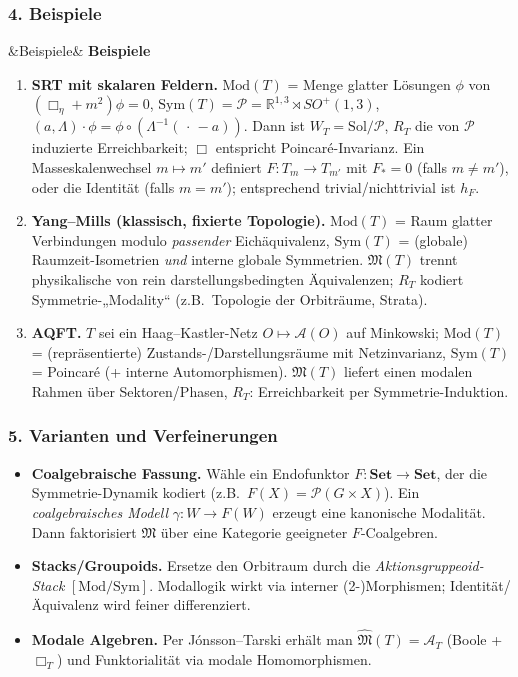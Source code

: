 \documentclass[10pt, letterpaper]{article}
\newenvironment{romanenum}[1][]
  {%
    \ifx&#1&
    \else
      \textbf{#1}\quad
    \fi
    \begin{enumerate}[label=\roman*)]
  }
  {%
    \end{enumerate}%
  }
\begin{document}
\subsubsection*{4. Beispiele}

\begin{romanenum}[Beispiele]
\item \textbf{SRT mit skalaren Feldern.} 
$\mathrm{Mod}(T)$ = Menge glatter Lösungen $\phi$ von $(\Box_\eta+m^2)\phi=0$, 
$\mathrm{Sym}(T)=\mathcal{P}=\mathbb{R}^{1,3}\rtimes SO^+(1,3)$, 
$(a,\Lambda)\cdot \phi=\phi\circ(\Lambda^{-1}(\,\cdot\,-a))$.
Dann ist $W_T=\mathrm{Sol}/\mathcal{P}$, $R_T$ die von $\mathcal{P}$ induzierte Erreichbarkeit;
$\Box$ entspricht Poincaré-Invarianz.
Ein Masseskalenwechsel $m\mapsto m'$ definiert $F:T_m\to T_{m'}$ mit $F_{\!*}=0$ (falls $m\neq m'$),
oder die Identität (falls $m=m'$); entsprechend trivial/nichttrivial ist $h_F$.

\item \textbf{Yang–Mills (klassisch, fixierte Topologie).} 
$\mathrm{Mod}(T)$ = Raum glatter Verbindungen modulo \emph{passender} Eichäquivalenz,
$\mathrm{Sym}(T)$ = (globale) Raumzeit-Isometrien \emph{und} interne globale Symmetrien.
$\mathfrak{M}(T)$ trennt physikalische von rein darstellungsbedingten Äquivalenzen; 
$R_T$ kodiert Symmetrie-„Modality“ (z.B.\ Topologie der Orbiträume, Strata).

\item \textbf{AQFT.}
$T$ sei ein Haag–Kastler-Netz $O\mapsto \mathcal{A}(O)$ auf Minkowski;
$\mathrm{Mod}(T)$ = (repräsentierte) Zustands-/Darstellungsräume mit Netzinvarianz,
$\mathrm{Sym}(T)$ = Poincaré (+ interne Automorphismen). 
$\mathfrak{M}(T)$ liefert einen modalen Rahmen über Sektoren/Phasen, 
$R_T$: Erreichbarkeit per Symmetrie-Induktion.
\end{romanenum}

\subsubsection*{5. Varianten und Verfeinerungen}

\begin{itemize}
\item \textbf{Coalgebraische Fassung.} 
Wähle ein Endofunktor $F:\mathbf{Set}\to\mathbf{Set}$, der die Symmetrie-Dynamik kodiert
(z.B.\ $F(X)=\mathcal{P}(G\times X)$). Ein \emph{coalgebraisches Modell} 
$\gamma:W\to F(W)$ erzeugt eine kanonische Modalität. 
Dann faktorisiert $\mathfrak{M}$ über eine Kategorie geeigneter $F$-Coalgebren.

\item \textbf{Stacks/Groupoids.}
Ersetze den Orbitraum durch die \emph{Aktionsgruppeoid-Stack} $[\mathrm{Mod}/\mathrm{Sym}]$.
Modallogik wirkt via interner (2-)Morphismen; Identität/Äquivalenz wird feiner differenziert.

\item \textbf{Modale Algebren.}
Per Jónsson–Tarski erhält man $\widehat{\mathfrak{M}}(T)=\mathcal{A}_T$ 
(Boole + $\Box_T$) und Funktorialität via modale Homomorphismen.
\end{itemize}
\end{document}
